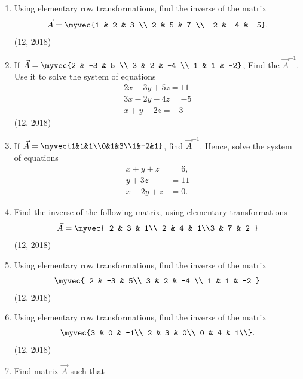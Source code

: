 \begin{enumerate}[label=\thesubsection.\arabic*,ref=\thesubsection.\theenumi]
\item Using elementary row transformations, find the inverse of the matrix 
\begin{align*}
	\vec{A}=\myvec{1 & 2 & 3 \\ 2 & 5 & 7 \\ -2 & -4 & -5}.
\end{align*}
\hfill (12, 2018)
\item If $\vec{A}=\myvec{2 & -3 & 5 \\ 3 & 2 & -4 \\ 1 & 1 & -2}$, Find the $\vec{A}^{-1}$. Use it to solve the system of equations 
	\begin{align*}
		2x-3y+5z=11 \\
		3x-2y-4z=-5\\
		x+y-2z=-3
	\end{align*}
\hfill (12, 2018)
\item If $ {\vec{A}} = \myvec{1&1&1\\0&1&3\\1&-2&1}$, find $\vec{A}^{-1}$.
Hence, solve the system of equations 
\begin{align*}
    x+y+z&=6 ,\\
    y+3z&=11 \\
    x-2y+z&= 0.
\end{align*}
\item Find the inverse of the following matrix, using elementary transformations
 \begin{align*}
 \vec{A}=\myvec{ 2 & 3 & 1\\ 2 & 4 & 1\\3 & 7 & 2 }
 \end{align*}
\hfill (12, 2018)
\item Using elementary row transformations, find the inverse of the matrix 
\begin{align*}
\myvec{
    2 & -3 & 5\\
    3 & 2 & -4 \\
    1 & 1 & -2
}
\end{align*}
\hfill (12, 2018)
\item Using elementary row transformations, find the inverse of the matrix 
\begin{align*}
	\myvec{3 & 0 & -1\\
	2 & 3 & 0\\
	0 & 4 & 1\\}.
\end{align*}
\hfill (12, 2018)
\item Find matrix $\vec{A}$ such that

\end{enumerate}
